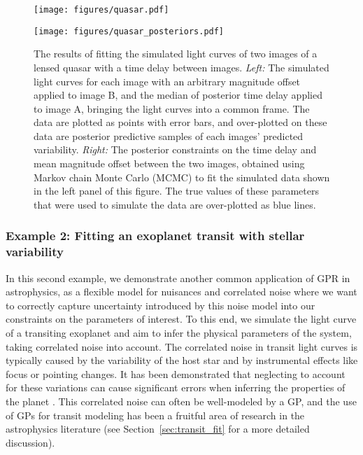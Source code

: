 \documentclass[letterpaper]{ar-1col}
\begin{document}
\begin{figure}[ht]
  \centering
  \begin{minipage}[t]{0.5\linewidth}
    \texttt{[image: figures/quasar.pdf]}
  \end{minipage} \hfill
  \begin{minipage}[t]{0.44\linewidth}
    \texttt{[image: figures/quasar\_posteriors.pdf]}
  \end{minipage}
  \caption{The results of fitting the simulated light curves of two images of a lensed quasar with a time delay between images.
  \emph{Left:} The simulated light curves for each image with an arbitrary magnitude offset applied to image B, and the median of posterior time delay applied to image A, bringing the light curves into a common frame.
  The data are plotted as points with error bars, and over-plotted on these data are posterior predictive samples of each images' predicted variability.
  \emph{Right:} The posterior constraints on the time delay and mean magnitude offset between the two images, obtained using Markov chain Monte Carlo (MCMC) to fit the simulated data shown in the left panel of this figure.
  The true values of these parameters that were used to simulate the data are over-plotted as blue lines.}
  \label{fig:quasar}
\end{figure}

\subsubsection{Example 2: Fitting an exoplanet transit with stellar variability}
\label{sec:transit}

In this second example, we demonstrate another common application of GPR in astrophysics, as a flexible model for nuisances and correlated noise where we want to correctly capture uncertainty introduced by this noise model into our constraints on the parameters of interest.
To this end, we simulate the light curve of a transiting exoplanet and aim to infer the physical parameters of the system, taking correlated noise into account.
The correlated noise in transit light curves is typically caused by the variability of the host star and by instrumental effects like focus or pointing changes.
It has been demonstrated that neglecting to account for these variations can cause significant errors when inferring the properties of the planet \citep{2006MNRAS.373..231P,2007A&A...472L..13G}.
This correlated noise can often be well-modeled by a GP, and the use of GPs for transit modeling has been a fruitful area of research in the astrophysics literature (see Section~\ref{sec:transit_fit} for a more detailed discussion).
\end{document}
